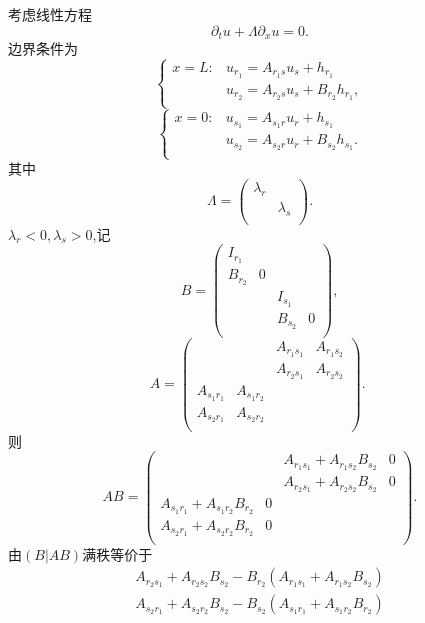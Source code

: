 \documentclass[notitlepage,cs4size,punct,oneside]{ctexrep}
\numberwithin{equation}{chapter}
\theoremstyle{mystyle}
\begin{document}
考虑线性方程
$$
\partial _tu+\varLambda \partial _xu=0.
$$
边界条件为
$$
\left\{ \begin{matrix}
	x=L:&		u_{r_1}=A_{r_1s}u_s+h_{r_1}\\
	&		u_{r_2}=A_{r_2s}u_s+B_{r_2}h_{r_1},\\
\end{matrix}\right. 
$$
$$
\left\{ \begin{matrix}
	x=0:&		u_{s_1}=A_{s_1r}u_r+h_{s_1}\\
	&		u_{s_2}=A_{s_2r}u_r+B_{s_2}h_{s_1}.\\
\end{matrix} \right. 
$$
其中
$$
\varLambda =\left( \begin{matrix}
	\lambda _r&		\\
	&		\lambda _s\\
\end{matrix} \right) .
$$
$\lambda _r <0,\lambda _s >0$,记
$$
B=\left( \begin{matrix}
	I_{r_1}&		&		&		\\
	B_{r_2}&		0&		&		\\
	&		&		I_{s_1}&		\\
	&		&		B_{s_2}&		0\\
\end{matrix} \right) ,
$$
$$
A=\left( \begin{matrix}
	&		&		A_{r_1s_1}&		A_{r_1s_2}\\
	&		&		A_{r_2s_1}&		A_{r_2s_2}\\
	A_{s_1r_1}&		A_{s_1r_2}&		&		\\
	A_{s_2r_1}&		A_{s_2r_2}&		&		\\
\end{matrix} \right) .\,\,
$$
则
$$
AB=\left( \begin{matrix}
	&		&		A_{r_1s_1}+A_{r_1s_2}B_{s_2}&		0\\
	&		&		A_{r_2s_1}+A_{r_2s_2}B_{s_2}&		0\\
	A_{s_1r_1}+A_{s_1r_2}B_{r_2}&		0&		&		\\
	A_{s_2r_1}+A_{s_2r_2}B_{r_2}&		0&		&		\\
\end{matrix} \right) .
$$
由$\left( B | AB\right)$满秩等价于
$$
\begin{aligned}
A_{r_2s_1}+A_{r_2s_2}B_{s_2}-B_{r_2}\left( A_{r_1s_1}+A_{r_1s_2}B_{s_2} \right)\\
A_{s_2r_1}+A_{s_2r_2}B_{s_2}-B_{s_2}\left( A_{s_1r_1}+A_{s_1r_2}B_{r_2} \right)\\
\end{aligned}
$$
\end{document}
